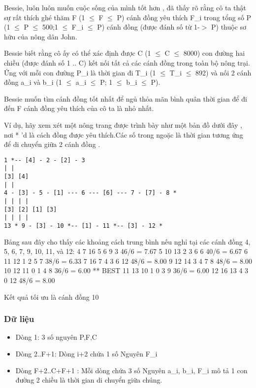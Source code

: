 



   Bessie, luôn luôn muốn cuộc sống của mình tốt hơn , đã thấy rõ rằng cô ta thật sự rất thích ghé thăm F (1  $\le$  F  $\le$  P) cánh đồng yêu thích F\_i trong tổng số P (1  $\le$  P  $\le$  500;1  $\le$  F\_i  $\le$  P) cánh đồng (được đánh số từ 1-$>$ P) thuộc sơ hữu của nông dân John.  

   Bessie biết rằng cô ấy có thể xác định được C (1  $\le$  C  $\le$  8000) con đường hai chiều (được đánh số 1 .. C) kết nối tất cả các cánh đồng trong toàn bộ nông trại. Ứng với mỗi con đường P\_i là thời gian đi T\_i (1  $\le$  T\_i  $\le$  892) và nối 2 cánh đồng a\_i và b\_i (1  $\le$  a\_i  $\le$  P; 1  $\le$  b\_i  $\le$  P).  

   Bessie muốn tìm cánh đồng tốt nhất để ngủ thỏa mãn bình quân thời gian để đi đến F cánh đồng yêu thích của cô ta là nhỏ nhất.  

   Ví dụ, hãy xem xét một nông trang được trình bày như một bản đồ dưới đây , nơi * 'd là cách đồng được yêu thích.Các số trong ngoặc là thời gian tương ứng để di chuyển giữa 2 cánh đồng .  
\begin{verbatim}
1 *-- [4] - 2 - [2] - 3
| |
[3] [4]
| |
4 - [3] - 5 - [1] --- 6 --- [6] --- 7 - [7] - 8 *
| | | |
[3] [2] [1] [3]
| | | |
13 * 9 - [3] - 10 *-- [1] - 11 *-- [3] - 12 *
\end{verbatim}

   Bảng sau đây cho thấy các khoảng cách trung bình nếu nghỉ tại các cánh đồng 4, 5, 6, 7, 9, 10, 11, và 12: 4 7 16 5 6 9 3 46/6 = 7.67 5 10 13 2 3 6 6 40/6 = 6.67 6 11 12 1 2 5 7 38/6 = 6.33 7 16 7 4 3 6 12 48/6 = 8.00 9 12 14 3 4 7 8 48/6 = 8.00 10 12 11 0 1 4 8 36/6 = 6.00 ** BEST 11 13 10 1 0 3 9 36/6 = 6.00 12 16 13 4 3 0 12 48/6 = 8.00  

   Kết quả tối ưu là cánh đồng 10  

\subsubsection{   Dữ liệu  }
\begin{itemize}
	\item     Dòng 1: 3 số nguyên P,F,C   
	\item     Dòng 2..F+1: Dòng i+2 chứa 1 số Nguyên F\_i   
	\item     Dòng F+2..C+F+1 : Mỗi dòng chứa 3 số Nguyên a\_i, b\_i, F\_i mô tả 1 con đường 2 chiều là thời gian di chuyển giữa chúng.   
\end{itemize}

